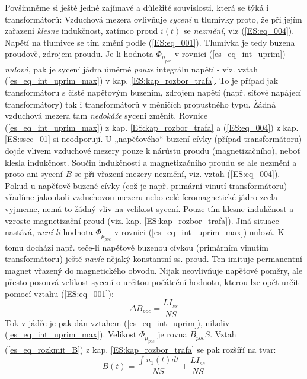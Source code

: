       Povšimněme si ještě jedné zajímavé a důležité souvislosti, která se týká i transformátorů:
      Vzduchová mezera ovlivňuje \emph{sycení} u tlumivky proto, že při jejím zařazení 
      \emph{klesne} indukčnost, zatímco proud \(i(t)\) se \emph{nezmění}, viz (\ref{ES:eq_004}). 
      Napětí na tlumivce se tím změní podle (\ref{ES:eq_001}). Tlumivka je tedy buzena
      proudově, zdrojem proudu. Je-li hodnota \(\Phi_{\mu_{poc}}\) v rovnici 
      (\ref{es_eq_int_uprim}) \emph{nulová}, pak je sycení jádra úměrné \emph{pouze} integrálu 
      napětí - viz. vztah (\ref{es_eq_int_uprim_max}) v kap. \ref{ES:kap_rozbor_trafa}. To je 
      případ jak transformátoru s čistě napěťovým buzením, zdrojem napětí (např. síťové napájecí 
      transformátory) tak i transformátorů v měničích propustného typu. Žádná vzduchová mezera tam 
      \emph{nedokáže} sycení změnit. Rovnice (\ref{es_eq_int_uprim_max}) z kap. 
      \ref{ES:kap_rozbor_trafa} a (\ref{ES:eq_004}) z kap. \ref{ES:ssec_01} si neodporují. U 
      „napěťového“ buzení cívky (případ transformátoru) dojde vlivem vzduchové mezery pouze k 
      nárůstu proudu (magnetizačního), neboť klesla indukčnost. Součin indukčnosti a magnetizačního 
      proudu se ale nezmění a proto ani sycení \(B\) se při vřazení mezery nezmění, viz. vztah 
      (\ref{ES:eq_004}). Pokud u napěťově buzené cívky (což je např. primární vinutí
      transformátoru) vřadíme jakoukoli vzduchovou mezeru nebo celé feromagnetické jádro zcela
      vyjmeme, nemá to žádný vliv na velikost sycení. Pouze tím klesne indukčnost a vzroste 
      magnetizační proud (viz. kap. \ref{ES:kap_rozbor_trafa}). Jiná situace nastává, 
      \emph{není-li} hodnota \(\Phi_{\mu_{poc}}\) v rovnici (\ref{es_eq_int_uprim_max}) nulová. K 
      tomu dochází např. teče-li napěťově buzenou cívkou (primárním vinutím transformátoru) ještě 
      \emph{navíc} nějaký konstantní ss. proud. Ten imituje permanentní magnet vřazený do 
      magnetického obvodu. Nijak neovlivňuje napěťové poměry, ale přesto posouvá velikost sycení o 
      určitou počáteční hodnotu, kterou lze opět určit pomocí vztahu (\ref{ES:eq_001}):
      \begin{equation}\label{ES:eq_013}
         \Delta B_{poc} = \frac{LI_{ss}}{NS}
      \end{equation}
      Tok v jádře je pak dán vztahem (\ref{es_eq_int_uprim}), nikoliv (\ref{es_eq_int_uprim_max}). 
      Velikost \(\Phi_{\mu_{poc}}\) je rovna \(B_{poc}S\). Vztah (\ref{es_eq_rozkmit_B}) z kap. 
      \ref{ES:kap_rozbor_trafa} se pak rozšíří na tvar:
      \begin{equation}\label{ES_eq_014}
        B(t)=\frac{\int u_1(t)dt}{NS} + \frac{LI_{ss}}{NS}
      \end{equation}
      
